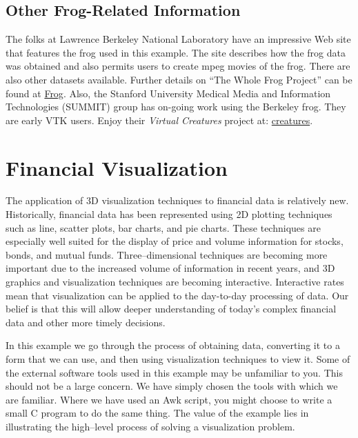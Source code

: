 \subsection{Other Frog-Related Information}

The folks at Lawrence Berkeley National Laboratory have an impressive Web site that features the frog used in this example. The site describes how the frog data was obtained and also permits users to create mpeg movies of the frog. There are also other datasets available. Further details on ``The Whole Frog Project'' can be found at \href{http://www-itg.lbl.gov/Frog}{Frog}. Also, the Stanford University Medical Media and Information Technologies (SUMMIT) group has on-going work using the Berkeley frog. They are early VTK users. Enjoy their \emph{Virtual Creatures} project at: \href{http://summit.stanford.edu/creatures}{creatures}.
\clearpage


\section{Financial Visualization}

The application of 3D visualization techniques to financial data is relatively new. Historically, financial data has been represented using 2D plotting techniques such as line, scatter plots, bar charts, and pie charts. These techniques are especially well suited for the display of price and volume information for stocks, bonds, and mutual funds. Three--dimensional techniques are becoming more important due to the increased volume of information in recent years, and 3D graphics and visualization techniques are becoming interactive. Interactive rates mean that visualization can be applied to the day-to-day processing of data. Our belief is that this will allow deeper understanding of today's complex financial data and other more timely decisions.

In this example we go through the process of obtaining data, converting it to a form that we can use, and then using visualization techniques to view it. Some of the external software tools used in this example may be unfamiliar to you. This should not be a large concern. We have simply chosen the tools with which we are familiar. Where we have used an Awk script, you might choose to write a small C program to do the same thing. The value of the example lies in illustrating the high--level process of solving a visualization problem.

